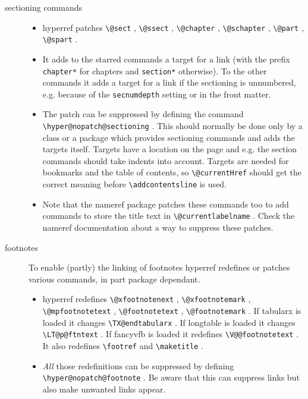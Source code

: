 \documentclass{article}
\newcommand*{\cs}[1]{%
  \texttt{\textbackslash #1}%
}
\newcommand*{\xpackage}[1]{\textsf{#1}}
\begin{document}
\begin{description}
\item[sectioning commands]
\begin{itemize}
\item hyperref patches \cs{@sect}, \cs{@ssect}, \cs{@chapter}, \cs{@schapter},
\cs{@part}, \cs{@spart}.

\item It adds to the starred commands a target for a link (with the
prefix \texttt{chapter*} for chapters and \texttt{section*} otherwise).
To the other commands it adds a target for a link
if the sectioning is unnumbered, e.g. because of the \texttt{secnumdepth}
setting or in the front matter.

\item The patch can be suppressed by defining the command \cs{hyper@nopatch@sectioning}.
This should normally be done only by a class or a package
which provides sectioning commands and adds the targets itself.
Targets have a location on the page and e.g. the section commands should take indents into
account. Targets are needed for bookmarks and the table of contents,
so \cs{@currentHref} should get the correct meaning before
\cs{addcontentsline} is used.

\item Note that the \xpackage{nameref} package patches these commands too
to add commands to store the title text in \cs{@currentlabelname}.
Check the \xpackage{nameref} documentation about a way to suppress these patches.
\end{itemize}

\item[footnotes] To enable (partly) the linking of footnotes hyperref redefines or patches various commands, in part package dependant.
\begin{itemize}
\item hyperref redefines \cs{@xfootnotenext}, \cs{@xfootnotemark}, \cs{@mpfootnotetext},
    \cs{@footnotetext}, \cs{@footnotemark}.
    If \xpackage{tabularx} is loaded it changes \cs{TX@endtabularx}. If \xpackage{longtable} is loaded it changes \cs{LT@p@ftntext}.
    If \xpackage{fancyvfb} is loaded it redefines \cs{V@@footnotetext}. It also redefines \cs{footref} and \cs{maketitle}.

\item \emph{All} those redefinitions can be suppressed by defining \cs{hyper@nopatch@footnote}. Be aware that this can suppress links but also make unwanted links appear.
\end{itemize}


\end{description}
\end{document}

